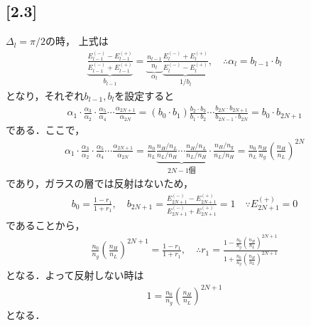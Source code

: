 \documentclass[12pt,dvipdfmx]{jsarticle}
\begin{document}
\subsection*{\large{[2.3]}}
$\Delta_{l}=\pi/2$の時，
上式は
\begin{eqnarray}
  \underbrace{\frac{E_{l-1}^{(-)}-E_{l-1}^{(+)}}{E_{l-1}^{(-)}+E_{l-1}^{(+)}}}_{b_{l-1}} = \underbrace{\frac{n_{l-1}}{n_l}}_{\alpha_l}\underbrace{\frac{E_l^{(-)}+E_l^{(+)}}{E_l^{(-)}-E_l^{(+)}}}_{1/b_l}, \quad\therefore \alpha_l = b_{l-1}\cdot b_l
\end{eqnarray}
となり，それぞれ$b_{l-1},b_l$を設定すると
\begin{eqnarray}
  \alpha_1\cdot \frac{\alpha_3}{\alpha_2}\cdot\frac{\alpha_5}{\alpha_4}\cdots \frac{\alpha_{2N+1}}{\alpha_{2N}} = (b_0\cdot b_1)\frac{b_2 \cdot b_3}{b_1 \cdot b_2}\cdots \frac{b_{2N}\cdot b_{2N+1}}{b_{2N-1}\cdot b_{2N}} = b_0 \cdot b_{2N+1}
\end{eqnarray}
である．ここで，
\begin{eqnarray}
  \alpha_1\cdot \frac{\alpha_3}{\alpha_2}\cdot\frac{\alpha_5}{\alpha_4}\cdots \frac{\alpha_{2N+1}}{\alpha_{2N}}  = \frac{n_0}{n_L}\underbrace{\frac{n_H/n_L}{n_L/n_H}\cdots \frac{n_H/n_L}{n_L/n_H}}_{2N-1個} \cdot \frac{n_H/n_g}{n_L/n_H} = \frac{n_0}{n_L}\frac{n_H}{n_g}\left( \frac{n_H}{n_L} \right)^{2N}
\end{eqnarray}
であり，ガラスの層では反射はないため，
\begin{eqnarray}
  b_0 = \frac{1-r_1}{1+r_1}, \quad b_{2N+1} = \frac{E_{2N+1}^{(-)}-E_{2N+1}^{(+)}}{E_{2N+1}^{(-)}+E_{2N+1}^{(+)}} =1 \quad\because E_{2N+1}^{(+)} =0
\end{eqnarray}
であることから，
\begin{eqnarray}
  \frac{n_0}{n_g}\left( \frac{n_H}{n_L} \right)^{2N+1} = \frac{1-r_1}{1+r_1}, \quad\therefore r_1 = \frac{1-\frac{n_0}{n_g}\left( \frac{n_H}{n_L} \right)^{2N+1}}{1+\frac{n_0}{n_g}\left( \frac{n_H}{n_L} \right)^{2N+1}}
\end{eqnarray}
となる．よって反射しない時は
\begin{eqnarray}
  1 = \frac{n_0}{n_g}\left( \frac{n_H}{n_L} \right)^{2N+1}
\end{eqnarray}
となる．
\end{document}
